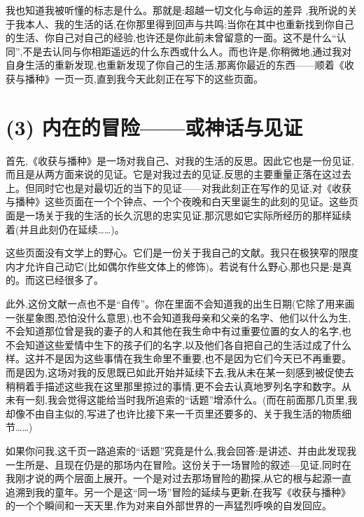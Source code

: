 我也知道我被听懂的标志是什么。那就是:超越一切文化与命运的差异
,我所说的关于我本人、我的生活的话,在你那里得到回声与共鸣;当你在其中也重新找到你自己的生活、你自己对自己的经验,也许还是你此前未曾留意的一面。这不是什么“认同”,不是去认同与你相距遥远的什么东西或什么人。而也许是,你稍微地,通过我对自身生活的重新发现,也重新发现了你自己的生活,那离你最近的东西——顺着《收获与播种》一页一页,直到我今天此刻正在写下的这些页面。

\section{(3) 内在的冒险——或神话与见证}

首先,《收获与播种》是一场对我自己、对我的生活的反思。因此它也是一份见证,而且是从两方面来说的见证。它是对我过去的见证,反思的主要重量正落在这过去上。但同时它也是对最切近的当下的见证——对我此刻正在写作的见证,对《收获与播种》这些页面在一个个钟点、一个个夜晚和白天里诞生的此刻的见证。这些页面是一场关于我的生活的长久沉思的忠实见证,那沉思如它实际所经历的那样延续着(并且此刻仍在延续……)。

这些页面没有文学上的野心。它们是一份关于我自己的文献。我只在极狭窄的限度内才允许自己动它(比如偶尔作些文体上的修饰)。若说有什么野心,那也只是:是真的。而这已经很多了。

此外,这份文献一点也不是“自传”。你在里面不会知道我的出生日期(它除了用来画一张星象图,恐怕没什么意思),也不会知道我母亲和父亲的名字、他们以什么为生,不会知道那位曾是我的妻子的人和其他在我生命中有过重要位置的女人的名字,也不会知道这些爱情中生下的孩子们的名字,以及他们各自把自己的生活过成了什么样。这并不是因为这些事情在我生命里不重要,也不是因为它们今天已不再重要。而是因为,这场对我的反思既已如此开始并延续下去,我从未在某一刻感到被促使去稍稍着手描述这些我在这里那里掠过的事情,更不会去认真地罗列名字和数字。从未有一刻,我会觉得这能给当时我所追索的“话题”增添什么。(而在前面那几页里,我却像不由自主似的,写进了也许比接下来一千页里还要多的、关于我生活的物质细节……)

如果你问我,这千页一路追索的“话题”究竟是什么,我会回答:是讲述、并由此发现我一生所是、且现在仍是的那场内在冒险。这份关于一场冒险的叙述—见证,同时在我刚才说的两个层面上展开。一个是对过去那场冒险的勘探,从它的根与起源一直追溯到我的童年。另一个是这“同一场”冒险的延续与更新,在我写《收获与播种》的一个个瞬间和一天天里,作为对来自外部世界的一声猛烈呼唤的自发回应。

